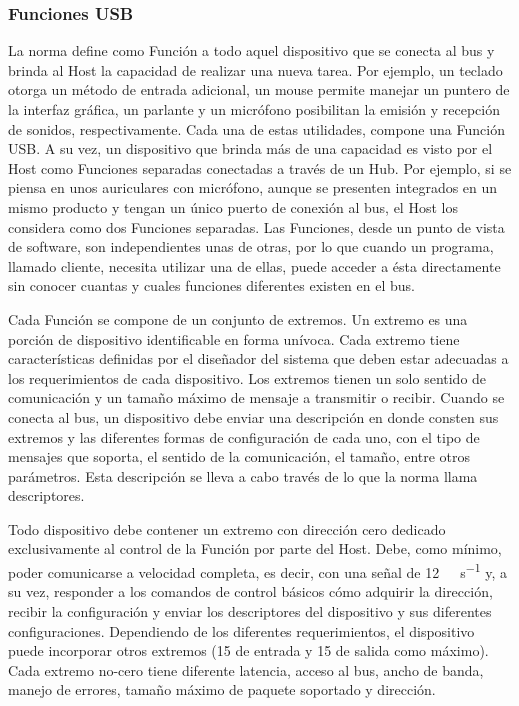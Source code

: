 \subsubsection{Funciones USB}
	La norma define como Función a todo aquel dispositivo que se conecta al bus y brinda al Host la capacidad de realizar una nueva tarea. Por ejemplo, un teclado otorga un método de entrada adicional, un mouse permite manejar un puntero de la interfaz gráfica, un parlante y un micrófono posibilitan la emisión y recepción de sonidos, respectivamente. Cada una de estas utilidades, compone una Función USB. A su vez, un dispositivo que brinda más de una capacidad es visto por el Host como Funciones separadas conectadas a través de un Hub. Por ejemplo, si se piensa en unos auriculares con micrófono, aunque se presenten integrados en un mismo producto y tengan un único puerto de conexión al bus, el Host los considera como dos Funciones separadas. Las Funciones, desde un punto de vista de software, son independientes unas de otras, por lo que cuando un programa, llamado cliente, necesita utilizar una de ellas, puede acceder a ésta directamente sin conocer cuantas y cuales funciones diferentes existen en el bus.%
	
	Cada Función se compone de un conjunto de extremos. Un extremo es una porción de dispositivo identificable en forma unívoca\cite{USBspec}. Cada extremo tiene características definidas por el diseñador del sistema que deben estar adecuadas a los requerimientos de cada dispositivo. Los extremos tienen un solo sentido de comunicación y un tamaño máximo de mensaje a transmitir o recibir. Cuando se conecta al bus, un dispositivo debe enviar una descripción en donde consten sus extremos y las diferentes formas de configuración de cada uno, con el tipo de mensajes que soporta, el sentido de la comunicación, el tamaño, entre otros parámetros. Esta descripción se lleva a cabo través de lo que la norma llama descriptores.%
	
	Todo dispositivo debe contener un extremo con dirección cero dedicado exclusivamente al control de la Función por parte del Host. Debe, como mínimo, poder comunicarse a velocidad completa, es decir, con una señal de \SI{12}{\mega\bit\per\second} y, a su vez, responder a los comandos de control básicos cómo adquirir la dirección, recibir la configuración y enviar los descriptores del dispositivo y sus diferentes configuraciones. Dependiendo de los diferentes requerimientos, el dispositivo puede incorporar otros extremos (15 de entrada y 15 de salida como máximo). Cada extremo no-cero tiene diferente latencia, acceso al bus, ancho de banda, manejo de errores, tamaño máximo de paquete soportado y dirección.
	
